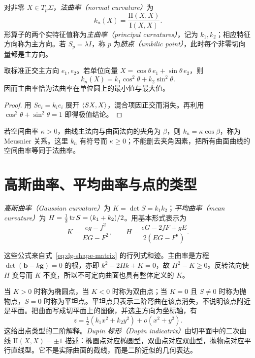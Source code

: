 \begin{definition}[法曲率与主曲率]
对非零 $X\in T_p\Sigma$，\emph{法曲率（normal curvature）}为
\[
 k_n(X)=\frac{\mathrm{II}(X,X)}{\mathrm I(X,X)}.
\]
形算子的两个实特征值称为\emph{主曲率（principal curvatures）}，记为 $k_1,k_2$；相应特征方向称为主方向。若 $S_p=\lambda I$，称 $p$ 为\emph{脐点（umbilic point）}，此时每个非零切向量都是主方向。
\end{definition}

\begin{theorem}
取标准正交主方向 $e_1,e_2$。若单位向量 $X=\cos\theta\,e_1+\sin\theta\,e_2$，则
\begin{equation}
 k_n(X)=k_1\cos^2\theta+k_2\sin^2\theta.
 \label{eq:dg-euler-curvature}
\end{equation}
因而主曲率恰为法曲率在单位圆上的最小值与最大值。
\end{theorem}
\begin{proof}
用 $Se_i=k_ie_i$ 展开 $\langle SX,X\rangle$，混合项因正交而消失。再利用 $\cos^2\theta+\sin^2\theta=1$ 即得极值结论。
\end{proof}
若空间曲率 $\kappa>0$，曲线主法向与曲面法向的夹角为 $\beta$，则 $k_n=\kappa\cos\beta$，称为 Meusnier 关系。这里 $k_n$ 有符号而 $\kappa\ge0$；不能删去夹角因素，把所有曲面曲线的空间曲率等同于法曲率。

\section{高斯曲率、平均曲率与点的类型}
\begin{definition}[高斯曲率与平均曲率]
\emph{高斯曲率（Gaussian curvature）}为 $K=\det S=k_1k_2$；\emph{平均曲率（mean curvature）}为 $H=\tfrac12\operatorname{tr} S=(k_1+k_2)/2$。用基本形式表示为
\begin{equation}
 K=\frac{eg-f^2}{EG-F^2},\qquad
 H=\frac{eG-2fF+gE}{2(EG-F^2)}.
 \label{eq:dg-KH}
\end{equation}
\end{definition}
这些公式来自式~\eqref{eq:dg-shape-matrix} 的行列式和迹。主曲率是方程 $\det(\mathbf b-k\mathbf g)=0$ 的根，亦即 $k^2-2Hk+K=0$，故 $H^2-K\ge0$。反转法向使 $H$ 变号而 $K$ 不变，所以不可定向曲面也具有整体定义的 $K$。

当 $K>0$ 时称为椭圆点，当 $K<0$ 时称为双曲点；当 $K=0$ 且 $S\ne0$ 时称为抛物点，$S=0$ 时称为平坦点。平坦点只表示二阶弯曲在该点消失，不说明该点附近是平面。把曲面写成切平面上的图像，并选主方向为坐标轴，有
\[
 z=\tfrac12(k_1x^2+k_2y^2)+o(x^2+y^2).
\]
这给出点类型的二阶解释。\emph{Dupin 标形（Dupin indicatrix）}由切平面中的二次曲线 $\mathrm{II}(X,X)=\pm1$ 描述：椭圆点对应椭圆型，双曲点对应双曲型，抛物点对应平行直线型。它不是实际曲面的截线，而是二阶近似的几何表达。

